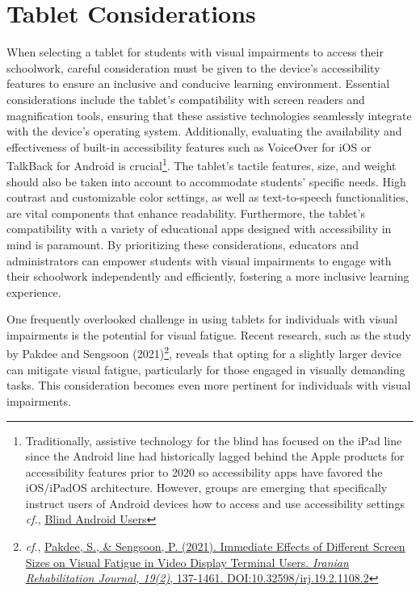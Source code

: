 \documentclass[14pt,letterpaper,twoside]{extreport}
\begin{document}
\hypertarget{tablet-considerations}{}\section{Tablet Considerations}\label{tab:tablelet-considerations}

When selecting a tablet for students with visual impairments to access their schoolwork, careful consideration must be given to the device's accessibility features to ensure an inclusive and conducive learning environment. Essential considerations include the tablet's compatibility with screen readers and magnification tools, ensuring that these assistive technologies seamlessly integrate with the device's operating system. Additionally, evaluating the availability and effectiveness of built-in accessibility features such as VoiceOver for iOS or TalkBack for Android is crucial\footnote{Traditionally, assistive technology for the blind has focused on the iPad line since the Android line had historically lagged behind the Apple products for accessibility features prior to 2020 so accessibility apps have favored the iOS/iPadOS architecture. However, groups are emerging that specifically instruct users of Android devices how to access and use accessibility settings \textit{cf.}, \href{https://www.youtube.com/channel/UCvEM-SmpwElNALldhp8hG1g}{Blind Android Users}}. The tablet's tactile features, size, and weight should also be taken into account to accommodate students' specific needs. High contrast and customizable color settings, as well as text-to-speech functionalities, are vital components that enhance readability. Furthermore, the tablet's compatibility with a variety of educational apps designed with accessibility in mind is paramount. By prioritizing these considerations, educators and administrators can empower students with visual impairments to engage with their schoolwork independently and efficiently, fostering a more inclusive learning experience.

One frequently overlooked challenge in using tablets for individuals with visual impairments is the potential for visual fatigue. Recent research, such as the study by Pakdee and Sengsoon (2021)\footnote{\textit{cf}., \href{https://www.researchgate.net/publication/352764109_Immediate_Effects_of_Different_Screen_Sizes_on_Visual_Fatigue_in_Video_Display_Terminal_Users}{Pakdee, S., \& Sengsoon, P. (2021). Immediate Effects of Different Screen Sizes on Visual Fatigue in Video Display Terminal Users. \textit{Iranian Rehabilitation Journal, 19(2)}, 137-1461. DOI:10.32598/irj.19.2.1108.2}}, reveals that opting for a slightly larger device can mitigate visual fatigue, particularly for those engaged in visually demanding tasks. This consideration becomes even more pertinent for individuals with visual impairments.
\end{document}
